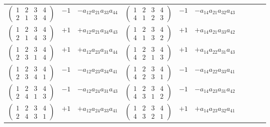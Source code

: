 \documentclass[11pt]{article}
\begin{document}
\begin{center}
\begin{tabular}{c|c|l||c|c|lcccc}
\hline
$\begin{pmatrix}1&2&3&4\\2&1&3&4\end{pmatrix}$ & $-1$ & $-a_{12}a_{21}a_{33}a_{44}$ & $\begin{pmatrix}1&2&3&4\\4&1&2&3\end{pmatrix}$ & $-1$ & $-a_{14}a_{21}a_{32}a_{43}$ \\
$\begin{pmatrix}1&2&3&4\\2&1&4&3\end{pmatrix}$ & $+1$ & $+a_{12}a_{21}a_{34}a_{43}$ & $\begin{pmatrix}1&2&3&4\\4&1&3&2\end{pmatrix}$ & $+1$ & $+a_{14}a_{21}a_{33}a_{42}$ \\
$\begin{pmatrix}1&2&3&4\\2&3&1&4\end{pmatrix}$ & $+1$ & $+a_{12}a_{23}a_{31}a_{44}$ & $\begin{pmatrix}1&2&3&4\\4&2&1&3\end{pmatrix}$ & $+1$ & $+a_{14}a_{22}a_{31}a_{43}$ \\
$\begin{pmatrix}1&2&3&4\\2&3&4&1\end{pmatrix}$ & $-1$ & $-a_{12}a_{23}a_{34}a_{41}$ & $\begin{pmatrix}1&2&3&4\\4&2&3&1\end{pmatrix}$ & $-1$ & $-a_{14}a_{22}a_{33}a_{41}$ \\
$\begin{pmatrix}1&2&3&4\\2&4&1&3\end{pmatrix}$ & $-1$ & $-a_{12}a_{24}a_{31}a_{43}$ & $\begin{pmatrix}1&2&3&4\\4&3&1&2\end{pmatrix}$ & $-1$ & $-a_{14}a_{23}a_{31}a_{42}$ \\
$\begin{pmatrix}1&2&3&4\\2&4&3&1\end{pmatrix}$ & $+1$ & $+a_{12}a_{24}a_{33}a_{41}$ & $\begin{pmatrix}1&2&3&4\\4&3&2&1\end{pmatrix}$ & $+1$ & $+a_{14}a_{23}a_{32}a_{41}$ \\
\end{tabular}
\end{center}
\end{document}
